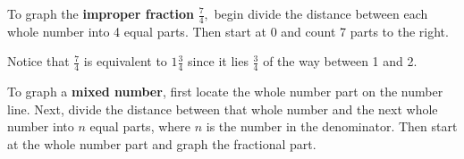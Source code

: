 \documentclass[handout, font=12pt]{ximera}
\begin{document}
\begin{example}

To graph the \textbf{improper fraction} $\textstyle \frac{7}{4},$ begin divide the distance between each whole number into 4 equal parts. 
Then start at 0 and count 7 parts to the right.

\begin{center}

\end{center}

Notice that $\frac{7}{4}$ is equivalent to $1 \frac{3}{4}$ since it lies $\frac{3}{4}$ of the way between 1 and 2.

\end{example}


To graph a \textbf{mixed number}, first locate the whole number part on the number line. Next, divide the distance between that whole number and the next whole number into $n$ equal parts, where $n$ is the number in the denominator.  Then start at the whole number part and graph the fractional part.
\end{document}
